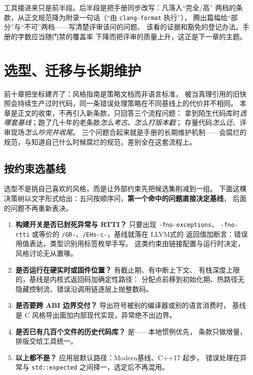 \documentclass[12pt,a4paper,fontset=fandol]{ctexbook}
\newcommand{\cpp}[1]{C++#1}
\newcommand{\Tp}[1]{\texttt{#1}}
\newcommand{\Lang}[1]{\textsf{#1}}
\newcommand{\DomLlvm}{\Lang{LLVM}}
\newcommand{\DomMod}{\Lang{Modern}}
\begin{document}
\begin{guideline}[title={装完三件工具之后手册该变成什么样}]
工具接进来只是前半段。后半段是把手册同步改写：凡落入``完全/高''
两档的条款，从正文规范降为附录一句话（``由 \Tp{clang-format} 执行''），
腾出篇幅给``部分''与``不可''两档——写清楚评审该问的问题、
该看的证据和豁免的登记办法。手册的字数应当随门禁的覆盖率
下降而把评审的质量上升，这正是下一章的主题。
\end{guideline}


\chapter{选型、迁移与长期维护}
\label{ch:ch14-decide}

前十章把坐标建齐了：风格指南是策略文档而非语言标准，
被当真理引用的旧快照会持续生产过时代码，同一条错误处理策略在不同基线上的代价并不相同。
本章是正文的收束，不再引入新条款，只回答三个流程问题：
拿到陌生代码库时\emph{选哪套基线}；跑了几十年的老条款\emph{怎么考古、怎么打版本戳}；
存量代码\emph{怎么迁}、评审现场\emph{怎么吵完并收尾}。
三个问题合起来就是手册的长期维护机制——会腐烂的规范，与知道自己什么时候腐烂的规范，差别全在这套流程上。

\section{按约束选基线}
\label{sec:ch14-baseline}

选型不是挑自己喜欢的风格，而是让外部约束先把候选集削减到一组。
下面这棵决策树以文字形式给出：五问按顺序问，\textbf{第一个命中的问题直接决定基线}，
后面的问题不再重新表决。

\begin{guideline}[title={五问定基线：命中即停}]
  \begin{enumerate}[label=\arabic*., leftmargin=2.6em]
    \item \textbf{构建开关是否已封死异常与 RTTI？} 只要出现 \Tp{-fno-exceptions}、
          \Tp{-fno-rtti} 或等价的 \Tp{/GR-}、\Tp{/EHs-c-}，基线就落在 \DomLlvm 式的
          返回值加断言：错误用值表达，类型识别用标签枚举手写。
          这类约束由链接配置与运行时决定，风格讨论无从置喙。
    \item \textbf{是否运行在硬实时或固件位置？} 有截止期、有中断上下文、
          有栈深度上限的，基线是内核式返回码加确定性路径：
          分配点前移到初始化期、热路径无隐藏控制流、错误沿调用链逐层上抛整数码。
    \item \textbf{是否要跨 ABI 边界交付？} 导出符号被别的编译器或别的语言消费时，
          基线是 \Lang{C} 风格导出面加内部现代实现，异常绝不出边界。
    \item \textbf{是否已有几百个文件的历史代码库？} 是——本地惯例优先，
          条款只做增量，排版交给工具统一。
    \item \textbf{以上都不是？} 应用层默认路径：\DomMod 基线、\cpp{17} 起步，
          错误处理在异常与 \Tp{std::expected} 之间择一，选定后不再混用。
  \end{enumerate}
\end{guideline}
\end{document}
